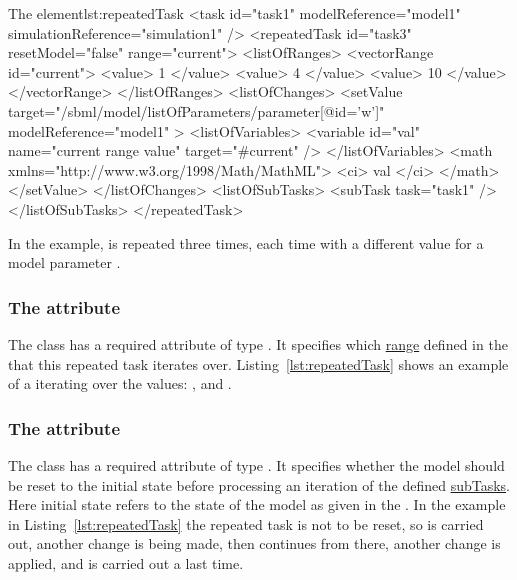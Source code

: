 
%
\begin{myXmlLst}{The  element}{lst:repeatedTask}
<task id="task1" modelReference="model1" simulationReference="simulation1" />
<repeatedTask id="task3" resetModel="false" range="current"> 
  <listOfRanges>
    <vectorRange id="current"> 
        <value> 1 </value> 
        <value> 4 </value> 
        <value> 10 </value> 
    </vectorRange> 
  </listOfRanges>
  <listOfChanges>
     <setValue target="/sbml/model/listOfParameters/parameter[@id='w']" modelReference="model1" > 
     <listOfVariables> 
         <variable id="val" name="current range value" target="#current" /> 
     </listOfVariables> 
     <math xmlns="http://www.w3.org/1998/Math/MathML"> 
         <ci> val </ci> 
     </math> 
    </setValue> 
</listOfChanges>
<listOfSubTasks>
  <subTask task="task1" />
</listOfSubTasks>
</repeatedTask>

\end{myXmlLst}
%
In the example,  is repeated three times, each time with a different value for a model parameter . 



\subsubsection{ The  attribute}
\label{sec:rangeAttribute}
The  class has a required attribute  of type . It specifies which \hyperref[class:range]{range} defined in the  that this repeated task iterates over. Listing~\ref{lst:repeatedTask} shows an example of a  iterating over the values: ,  and . 


\subsubsection{ The  attribute}
\label{sec:resetModel}
The  class has a required attribute  of type . It specifies whether the model should be reset to the initial state before processing an iteration of the defined \hyperref[class:subTasks]{subTasks}. Here initial state refers to the state of the model as given in the .  In the example in  Listing~\ref{lst:repeatedTask} the repeated task is not to be reset, so  is carried out, another change is being made, then  continues from there, another change is applied, and  is carried out a last time. 

